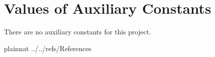 \documentclass[12pt]{article}
\begin{document}



\section{Values of Auxiliary Constants}

There are no auxiliary constants for this project.




\newpage

 {plainnat}
 {../../refs/References}

\newpage

\noindent {}
\end{document}
